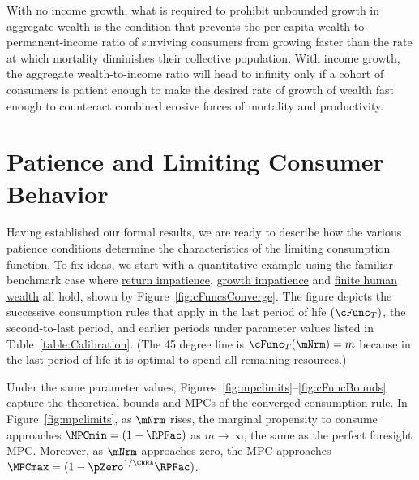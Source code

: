 \documentclass[BufferStockTheory]{subfiles}
\begin{document}
With no income growth, what is required to prohibit unbounded growth in aggregate wealth is the condition that prevents the per-capita wealth-to-permanent-income ratio of surviving consumers from growing faster than the rate at which mortality diminishes their collective population.
With income growth, the aggregate wealth-to-income ratio will head to infinity only if a cohort of consumers is patient enough to make the desired rate of growth of wealth fast enough to counteract combined erosive forces of mortality and productivity.

\hypertarget{Discussion-Growth-Impatience}{}
\section{Patience and Limiting Consumer Behavior}\label{sec:GICdiscussion}

\renewcommand{\figName}{cFuncsConverge} 
 

Having established our formal results, we are ready to describe how the various patience conditions determine the characteristics of the limiting consumption function.
To fix ideas, we start with a quantitative example using the familiar benchmark case where \hyperlink{RIC}{return impatience}, \hyperlink{GIC}{growth impatience} and \hyperlink{FHWC}{finite human wealth} all hold, shown by Figure~\ref{fig:cFuncsConverge}.
The figure depicts the successive consumption rules that apply in the last period of life $(\cFunc_{T})$, the second-to-last period, and earlier periods under parameter values listed in Table~\ref{table:Calibration}.
(The 45 degree line is $\cFunc_{T}(\mNrm) = m$ because in the last period of life it is optimal to spend all remaining resources.)

Under the same parameter values, Figures~\ref{fig:mpclimits}--\ref{fig:cFuncBounds} capture the theoretical bounds and MPCs of the converged consumption rule.
In Figure~\ref{fig:mpclimits}, as $\mNrm$ rises, the marginal propensity to consume approaches $\MPCmin=(1-\RPFac)$ as $m \rightarrow \infty$, the same as the perfect foresight MPC.
Moreover, as $\mNrm$ approaches zero, the MPC approaches $\MPCmax=(1-\pZero^{1/\CRRA}\RPFac)$.


\renewcommand{\figFile}{mpclimits}
\hypertarget{\figFile}{}

\renewcommand{\figFile}{cFuncBounds}
\hypertarget{\figFile}{}

\end{document}
